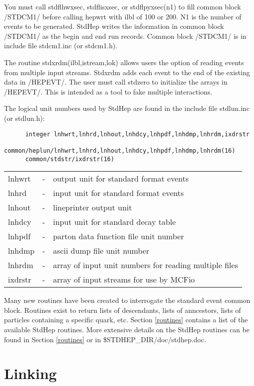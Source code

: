 You must call stdflhwxsec, stdflisxsec, or stdflpyxsec(n1) to fill
common block /STDCM1/ before calling hepwrt with ilbl of 100 or 200.  
N1 is the number of events to be generated.
StdHep writes the information in common block /STDCM1/ as the begin and
end run records.  Common block /STDCM1/ is in include file stdcm1.inc 
(or stdcm1.h).

The routine stdxrdm(ilbl,istream,lok) allows users the option
of reading events from multiple input streams.  
Stdxrdm adds each event to the end of the existing data in /HEPEVT/.  
The user must call stdzero to initialize the arrays in /HEPEVT/.
This is intended as a tool to fake multiple interactions.

The logical unit numbers used by StdHep are found in the include file
stdlun.inc (or stdlun.h):

\begin{verbatim}
      integer lnhwrt,lnhrd,lnhout,lnhdcy,lnhpdf,lnhdmp,lnhrdm,ixdrstr
      common/heplun/lnhwrt,lnhrd,lnhout,lnhdcy,lnhpdf,lnhdmp,lnhrdm(16)
      common/stdstr/ixdrstr(16)
\end{verbatim}
\begin{center}
\begin{tabular}{lcl}
lnhwrt&-&output unit for standard format events \\
lnhrd &-&input unit for standard format events \\
lnhout&-&lineprinter output unit\\ 
lnhdcy&-&input unit for standard decay table \\
lnhpdf&-&parton data function file unit number\\
lnhdmp&-&ascii dump file unit number \\
lnhrdm&-&array of input unit numbers for reading multiple files\\
ixdrstr&-&array of input streams for use by MCFio \\
\end{tabular}
\end{center}

Many new routines have been created to
interrogate the standard event common block.  
Routines exist to return lists of descendants,
lists of anncestors, lists of particles containing a specific quark, etc.
Section \ref{routines} contains a list of the available StdHep routines.  
More extensive details on the StdHep routines can be found in Section 
\ref{routines} or in \$STDHEP\_DIR/doc/stdhep.doc.

\section { Linking}

